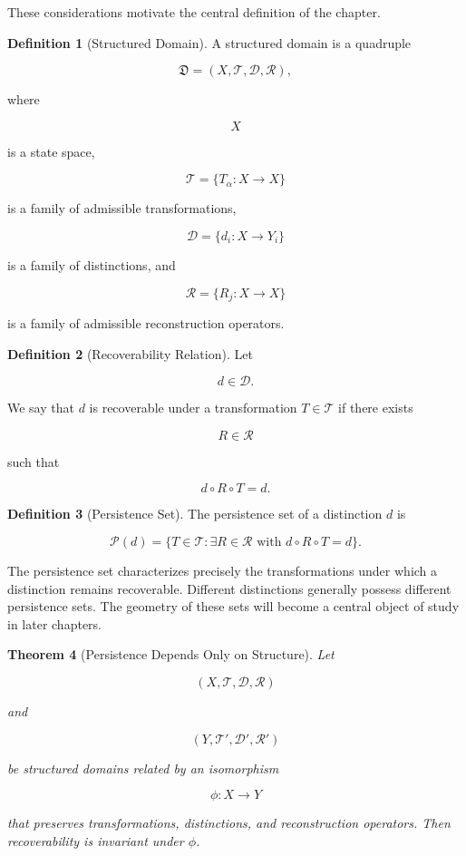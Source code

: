\documentclass[12pt,oneside]{article}
\newtheorem{theorem}{Theorem}[section] \newtheorem{lemma}[theorem]{Lemma} \newtheorem{proposition}[theorem]{Proposition} \newtheorem{corollary}[theorem]{Corollary}
\theoremstyle{definition}
\newtheorem{definition}[theorem]{Definition} \newtheorem{axiom}[theorem]{Axiom} \newtheorem{remark}[theorem]{Remark} \newtheorem{example}[theorem]{Example}
\begin{document}
These considerations motivate the central definition of the chapter.

\begin{definition}[Structured Domain]

A structured domain is a quadruple

\[
\mathfrak{D}
=
(X,\mathcal{T},\mathcal{D},\mathcal{R}),
\]

where

\[
X
\]

is a state space,

\[
\mathcal{T}
=
\{T_\alpha:X\rightarrow X\}
\]

is a family of admissible transformations,

\[
\mathcal{D}
=
\{d_i:X\rightarrow Y_i\}
\]

is a family of distinctions, and

\[
\mathcal{R}
=
\{R_j:X\rightarrow X\}
\]

is a family of admissible reconstruction operators.

\end{definition}

\begin{definition}[Recoverability Relation]

Let

\[
d\in\mathcal D.
\]

We say that \(d\) is recoverable under a transformation \(T\in\mathcal T\) if there exists

\[
R\in\mathcal R
\]

such that

\[
d \circ R \circ T
=
d.
\]

\end{definition}

\begin{definition}[Persistence Set]

The persistence set of a distinction \(d\) is

\[
\mathcal P(d)
=
\{T\in\mathcal T
:
\exists R\in\mathcal R
\text{ with }
d\circ R\circ T=d
\}.
\]

\end{definition}

The persistence set characterizes precisely the transformations under which a distinction remains recoverable. Different distinctions generally possess different persistence sets. The geometry of these sets will become a central object of study in later chapters.

\begin{theorem}[Persistence Depends Only on Structure]

Let

\[
(X,\mathcal T,\mathcal D,\mathcal R)
\]

and

\[
(Y,\mathcal T',\mathcal D',\mathcal R')
\]

be structured domains related by an isomorphism

\[
\phi:X\rightarrow Y
\]

that preserves transformations, distinctions, and reconstruction operators. Then recoverability is invariant under \(\phi\).

\end{theorem}
\end{document}

